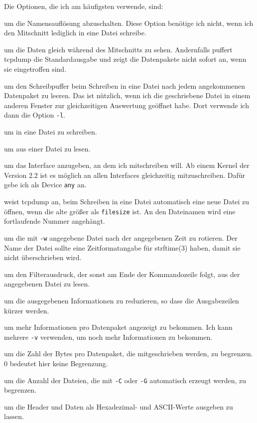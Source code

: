 \begin{normaltext}
  Die Optionen, die ich am häufigsten verwende, sind:
  \begin{description}
    \item[-n] um die Namensauflösung abzuschalten. Diese Option benötige ich
      nicht, wenn ich den Mitschnitt lediglich in eine Datei schreibe.
    \item[-l] um die Daten gleich während des Mitschnitts zu sehen.
      Andernfalls puffert tcpdump die Standardausgabe und zeigt die
      Datenpakete nicht sofort an, wenn sie eingetroffen sind.
    \item[-U] um den Schreibpuffer beim Schreiben in eine Datei nach jedem
      angekommenen Datenpaket zu leeren. Das ist nützlich, wenn ich die
      geschriebene Datei in einem anderen Fenster zur gleichzeitigen
      Auswertung geöffnet habe. Dort verwende ich dann die Option \verb?-l?.
    \item[-w filename] um in eine Datei zu schreiben.
    \item[-r filename] um aus einer Datei zu lesen.
    \item[-i device] um das Interface anzugeben, an dem ich mitschreiben will.
      Ab einem Kernel der Version 2.2 ist es möglich an allen Interfaces
      gleichzeitig mitzuschreiben. Dafür gebe ich als Device \verb?any? an.
    \item[-C filesize] weist tcpdump an, beim Schreiben in eine Datei
      automatisch eine neue Datei zu öffnen, wenn die alte größer als
      \verb?filesize? ist. An den Dateinamen wird eine fortlaufende Nummer
      angehängt.
    \item[-G seconds] um die mit \verb?-w? angegebene Datei nach der
      angegebenen Zeit zu rotieren. Der Name der Datei sollte eine
      Zeitformatangabe für strftime(3) haben, damit sie nicht überschrieben
      wird.
    \item[-F filename] um den Filterausdruck, der sonst am Ende der
      Kommandozeile folgt, aus der angegebenen Datei zu lesen.
    \item[-q] um die ausgegebenen Informationen zu reduzieren, so dass die
      Ausgabezeilen kürzer werden.
    \item[-v] um mehr Informationen pro Datenpaket angezeigt zu bekommen.
      Ich kann mehrere \verb?-v? verwenden, um noch mehr Informationen zu
      bekommen.
    \item[-s snaplen] um die Zahl der Bytes pro Datenpaket, die mitgeschrieben
      werden, zu begrenzen. 0 bedeutet hier keine Begrenzung.
    \item[-W filecount] um die Anzahl der Dateien, die mit \verb?-C? oder
      \verb?-G? automatisch erzeugt werden, zu begrenzen.
    \item[-x]
    \item[-X] um die Header und Daten als Hexadezimal- und ASCII-Werte
      ausgeben zu lassen.
    \item
  \end{description}


\end{normaltext}
